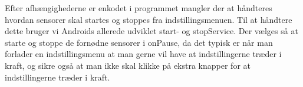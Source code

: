 Efter afhængighederne er enkodet i programmet mangler der at håndteres hvordan sensorer skal startes og stoppes fra indstillingsmenuen.
Til at håndtere dette bruger vi Androids allerede udviklet start- og stopService.
Der vælges så at starte og stoppe de fornødne sensorer i onPause, da det typisk er når man forlader en indstillingsmenu at man gerne vil have at indstillingerne træder i kraft, og sikre også at man ikke skal klikke på ekstra knapper for at indstillingerne træder i kraft.